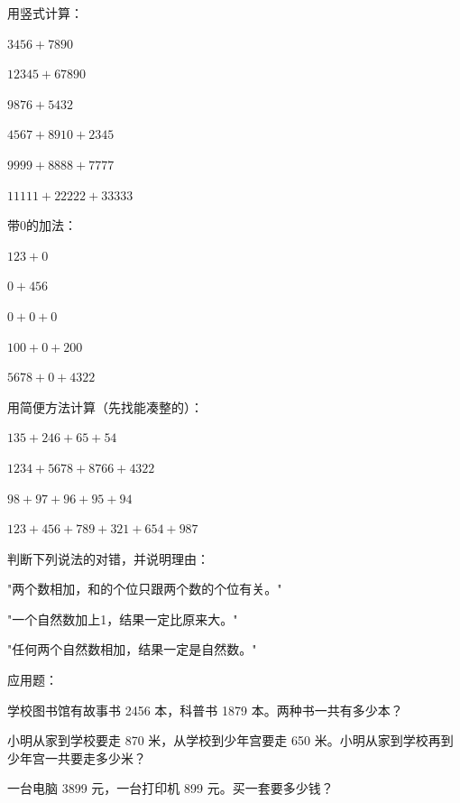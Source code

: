 \begin{exercise}
\item 用竖式计算：
  \begin{subexercise}
    \item $3456+7890$
    \item $12345+67890$
    \item $9876+5432$
    \item $4567+8910+2345$
    \item $9999+8888+7777$
    \item $11111+22222+33333$
  \end{subexercise}

\item 带0的加法：
  \begin{subexercise}
    \item $123+0$
    \item $0+456$
    \item $0+0+0$
    \item $100+0+200$
    \item $5678+0+4322$
  \end{subexercise}

\item 用简便方法计算（先找能凑整的）：
  \begin{subexercise}
    \item $135+246+65+54$
    \item $1234+5678+8766+4322$
    \item $98+97+96+95+94$
    \item $123+456+789+321+654+987$
  \end{subexercise}

\item 判断下列说法的对错，并说明理由：
  \begin{subexercise}
    \item "两个数相加，和的个位只跟两个数的个位有关。"
    \item "一个自然数加上1，结果一定比原来大。"
    \item "任何两个自然数相加，结果一定是自然数。"
  \end{subexercise}

\item 应用题：
  \begin{subexercise}
    \item 学校图书馆有故事书 2456 本，科普书 1879 本。两种书一共有多少本？
    \item 小明从家到学校要走 870 米，从学校到少年宫要走 650 米。小明从家到学校再到少年宫一共要走多少米？
    \item 一台电脑 3899 元，一台打印机 899 元。买一套要多少钱？
  \end{subexercise}
\end{exercise}

